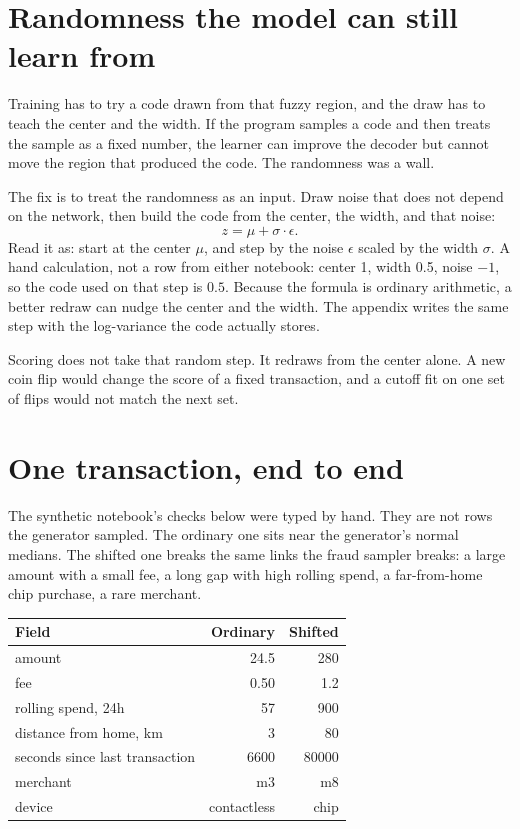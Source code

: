 \documentclass[11pt]{article}
\begin{document}
\section{Randomness the model can still learn from}

Training has to try a code drawn from that fuzzy region, and the draw
has to teach the center and the width. If the program samples a code and
then treats the sample as a fixed number, the learner can improve the
decoder but cannot move the region that produced the code. The randomness
was a wall.

The fix is to treat the randomness as an input. Draw noise that does not
depend on the network, then build the code from the center, the width,
and that noise:
\[
z = \mu + \sigma \cdot \epsilon .
\]
Read it as: start at the center $\mu$, and step by the noise $\epsilon$
scaled by the width $\sigma$. A hand calculation, not a row from either
notebook: center 1, width 0.5, noise $-1$, so the code used on that step
is $0.5$. Because the formula is ordinary arithmetic, a better redraw can
nudge the center and the width. The appendix writes the same step with
the log-variance the code actually stores.

Scoring does not take that random step. It redraws from the center alone.
A new coin flip would change the score of a fixed transaction, and a
cutoff fit on one set of flips would not match the next set.

\section{One transaction, end to end}
\label{sec:walk}

The synthetic notebook's checks below were typed by hand. They are not
rows the generator sampled. The ordinary one sits near the generator's
normal medians. The shifted one breaks the same links the fraud sampler
breaks: a large amount with a small fee, a long gap with high rolling
spend, a far-from-home chip purchase, a rare merchant.

\begin{center}
\small
\begin{tabular}{@{}lrr@{}}
\toprule
Field & Ordinary & Shifted \\
\midrule
amount & 24.5 & 280 \\
fee & 0.50 & 1.2 \\
rolling spend, 24h & 57 & 900 \\
distance from home, km & 3 & 80 \\
seconds since last transaction & 6600 & 80000 \\
merchant & m3 & m8 \\
device & contactless & chip \\
\bottomrule
\end{tabular}
\end{center}
\end{document}
